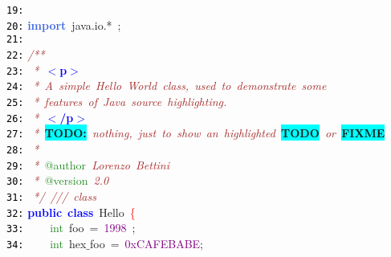 \documentclass{article}
\begin{document}
\mbox{}\texttt{\textcolor{Black}{19:}}  \\
\mbox{}\texttt{\textcolor{Black}{20:}} \textbf{\textcolor{RoyalBlue}{import}}\ java\textcolor{BrickRed}{.}io\textcolor{BrickRed}{.*}\ \textcolor{BrickRed}{;} \\
\mbox{}\texttt{\textcolor{Black}{21:}}  \\
\mbox{}\texttt{\textcolor{Black}{22:}} \textit{\textcolor{Brown}{/**}} \\
\mbox{}\texttt{\textcolor{Black}{23:}} \textit{\textcolor{Brown}{\ *\ }}\textbf{\textcolor{Blue}{$<$p$>$}} \\
\mbox{}\texttt{\textcolor{Black}{24:}} \textit{\textcolor{Brown}{\ *\ A\ simple\ Hello\ World\ class,\ used\ to\ demonstrate\ some}} \\
\mbox{}\texttt{\textcolor{Black}{25:}} \textit{\textcolor{Brown}{\ *\ features\ of\ Java\ source\ highlighting.}} \\
\mbox{}\texttt{\textcolor{Black}{26:}} \textit{\textcolor{Brown}{\ *\ }}\textbf{\textcolor{Blue}{$<$/p$>$}} \\
\mbox{}\texttt{\textcolor{Black}{27:}} \textit{\textcolor{Brown}{\ *\ }}\textbf{\colorbox{Cyan}{TODO:}}\textit{\textcolor{Brown}{\ nothing,\ just\ to\ show\ an\ highlighted\ }}\textbf{\colorbox{Cyan}{TODO}}\textit{\textcolor{Brown}{\ or\ }}\textbf{\colorbox{Cyan}{FIXME}} \\
\mbox{}\texttt{\textcolor{Black}{28:}} \textit{\textcolor{Brown}{\ *}} \\
\mbox{}\texttt{\textcolor{Black}{29:}} \textit{\textcolor{Brown}{\ *\ }}\textcolor{ForestGreen}{@author}\textit{\textcolor{Brown}{\ Lorenzo\ Bettini}} \\
\mbox{}\texttt{\textcolor{Black}{30:}} \textit{\textcolor{Brown}{\ *\ }}\textcolor{ForestGreen}{@version}\textit{\textcolor{Brown}{\ 2.0}} \\
\mbox{}\texttt{\textcolor{Black}{31:}} \textit{\textcolor{Brown}{\ */}}\ \textit{\textcolor{Brown}{///\ class}} \\
\mbox{}\texttt{\textcolor{Black}{32:}} \textbf{\textcolor{Blue}{public}}\ \textbf{\textcolor{Blue}{class}}\ \textcolor{TealBlue}{Hello}\ \textcolor{Red}{\{} \\
\mbox{}\texttt{\textcolor{Black}{33:}} \ \ \ \ \textcolor{ForestGreen}{int}\ foo\ \textcolor{BrickRed}{=}\ \textcolor{Purple}{1998}\ \textcolor{BrickRed}{;} \\
\mbox{}\texttt{\textcolor{Black}{34:}} \ \ \ \ \textcolor{ForestGreen}{int}\ hex$\_$foo\ \textcolor{BrickRed}{=}\ \textcolor{Purple}{0xCAFEBABE}\textcolor{BrickRed}{;} \\
\end{document}
